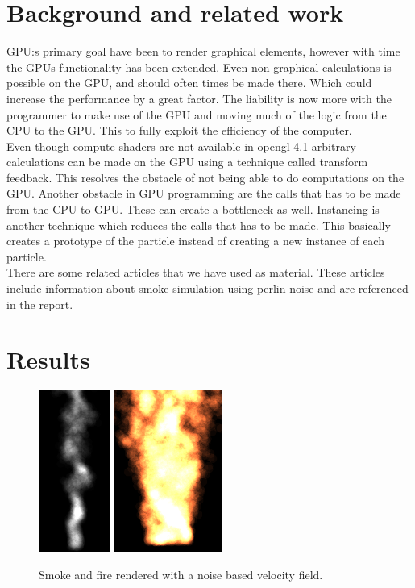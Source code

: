 \documentclass[report]{vgtc}
\begin{document}
\section{Background and related work}
GPU:s primary goal have been to render graphical elements, however with time the GPUs functionality has been extended. Even non graphical calculations is possible on the GPU, and should often times be made there. Which could increase the performance by a great factor. The liability is now more with the programmer to make use of the GPU and moving much of the logic from the CPU to the GPU. This to fully exploit the efficiency of the computer.
\\
Even though compute shaders are not available in opengl 4.1 arbitrary calculations can be made on the GPU using a technique called transform feedback. This resolves the obstacle of not being able to do computations on the GPU. Another obstacle in GPU programming are the calls that has to be made from the CPU to GPU. These can create a bottleneck as well. Instancing is another technique which reduces the calls that has to be made. This basically creates a prototype of the particle instead of creating a new instance of each particle.
\\
There are some related articles that we have used as material. These articles include information about smoke simulation using perlin noise and are referenced in the report.
\section{Results}

\begin{figure}[H]
\includegraphics[height=200px]{img/smoke.png}
\includegraphics[height=200px]{img/fire.png}
\caption{Smoke and fire rendered with a noise based velocity field.}
\end{figure}
\end{document}
